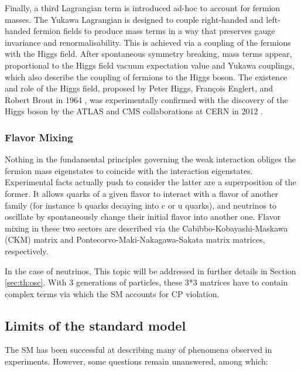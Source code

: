\documentclass[../main.tex]{subfiles}
\begin{document}
Finally, a third Lagrangian term is introduced ad-hoc to account for fermion masses. The Yukawa Lagrangian is designed to couple right-handed and left-handed fermion fields to produce mass terms in a way that preserves gauge invariance and renormalisability. This is achieved via a coupling of the fermions with the Higgs field. After spontaneous symmetry breaking, mass terms appear, proportional to the Higgs field vacuum expectation value and Yukawa couplings, which also describe the coupling of fermions to the Higgs boson. The existence and role of the Higgs field, proposed by Peter Higgs, François Englert, and Robert Brout in 1964 \cite{englert_broken_1964, higgs_broken_1964, higgs_broken_1964-1, guralnik_global_1964}, was experimentally confirmed with the discovery of the Higgs boson by the ATLAS and CMS collaborations at CERN in 2012 \cite{aad_observation_2012, chatrchyan_observation_2012}.

\subsubsection{Flavor Mixing}

Nothing in the fundamental principles governing the weak interaction obliges the fermion mass eigenstates to coincide with the interaction eigenstates. Experimental facts actually push to consider the latter are a superposition of the former. It allows quarks of a given flavor to interact with a flavor of another family (for instance b quarks decaying into c or u quarks), and neutrinos to oscillate by spontaneously change their initial flavor into another one. Flavor mixing in these two sectors are described via the Cabibbo-Kobayashi-Maskawa (CKM) matrix \cite{kobayashi_cp-violation_1973} and Pontecorvo-Maki-Nakagawa-Sakata matrix \cite{maki_remarks_1962} matrices, respectively.

In the case of neutrinos, This topic will be addressed in further details in Section \ref{sec:th:osc}. With 3 generations of particles, these 3*3 matrices have to contain complex terms via which the SM accounts for CP violation.


\subsection{Limits of the standard model}

The SM has been successful at describing many of phenomena observed in experiments. However, some questions remain unanswered, among which:
\end{document}
